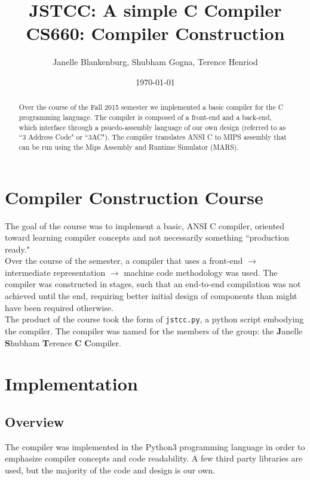 \documentclass{article}
\title{JSTCC: A simple C Compiler \\ CS660: Compiler Construction}
\author{Janelle Blankenburg, Shubham Gogna, Terence Henriod}
\date{\today}
\begin{document}
\clearpage            %
\maketitle            %
\thispagestyle{empty} %

\begin{abstract}
\noindent Over the course of the Fall 2015 semester we implemented a basic
compiler for the C programming language. The compiler is composed of a front-end
and a back-end, which interface through a psuedo-assembly language of our own
design (referred to as ``3 Address Code" or ``3AC"). The compiler translates
ANSI C to MIPS assembly that can be run using the Mips Assembly and Runtime 
Simulator (MARS).
\end{abstract}

\newpage
\section{Compiler Construction Course}
\noindent The goal of the course was to implement a basic, ANSI C compiler, oriented
toward learning compiler concepts and not necessarily something ``production
ready."\\

\noindent Over the course of the semester, a compiler that uses a front-end $\rightarrow$
intermediate representation $\rightarrow$ machine code methodology was used.
The compiler was constructed in stages, such that an end-to-end compilation
was not achieved until the end, requiring better initial design of components
than might have been required otherwise.\\

\noindent The product of the course took the form of \texttt{jstcc.py}, a python script
embodying the compiler. The compiler was named for the members of the group:
the \textbf{J}anelle \textbf{S}hubham \textbf{T}erence \textbf{C} 
\textbf{C}ompiler.


\section{Implementation}
\subsection{Overview}
\noindent The compiler was implemented in the Python3 programming language in order to
emphasize compiler concepts and code readability. A few third party libraries
are used, but the majority of the code and design is our own.\\
\end{document}

